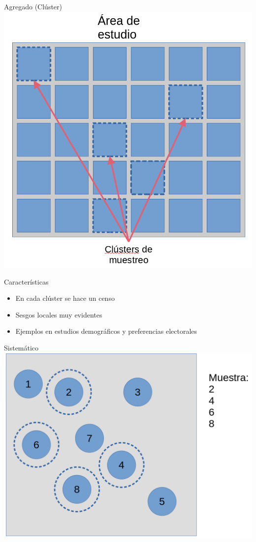\documentclass[
  11pt,
  ignorenonframetext,
]{beamer}
\begin{document}
\begin{frame}{Agregado (Clúster)}
\protect\hypertarget{agregado-cluxfaster}{}
\includegraphics{Figuras-tecnicas/Cluster.png}
\end{frame}

\begin{frame}{Características}
\protect\hypertarget{caracteruxedsticas-1}{}
\begin{itemize}
\item
  En cada clúster se hace un censo
\item
  Sesgos locales muy evidentes
\item
  Ejemplos en estudios demográficos y preferencias electorales
\end{itemize}
\end{frame}

\begin{frame}{Sistemático}
\protect\hypertarget{sistemuxe1tico}{}
\includegraphics{Figuras-tecnicas/Sistematico.png}
\end{frame}
\end{document}
